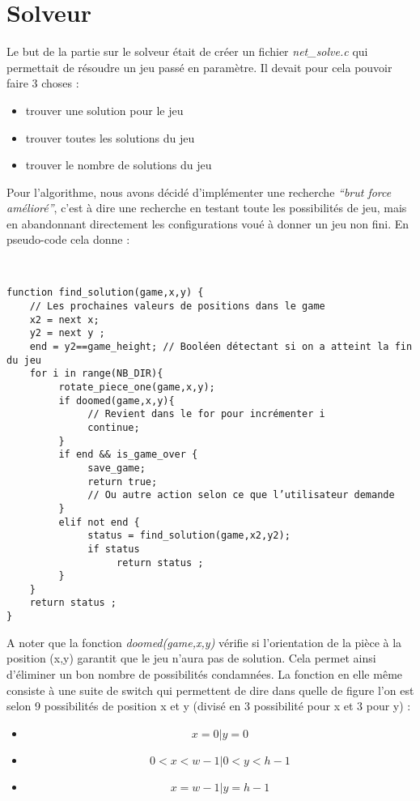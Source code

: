 ﻿\documentclass[12pt]{article}
\begin{document}
\section{Solveur}


Le but de la partie sur le solveur était de créer un fichier \emph{net\_solve.c} qui permettait de résoudre un jeu passé en paramètre. Il devait pour cela pouvoir faire 3 choses :
\begin{itemize}
\item trouver une solution pour le jeu
\item trouver toutes les solutions du jeu
\item trouver le nombre de solutions du jeu
\end{itemize}


Pour l’algorithme, nous avons décidé d'implémenter une recherche \emph{“brut force amélioré”}, c’est à dire une recherche en testant toute les possibilités de jeu, mais en abandonnant directement les configurations voué à donner un jeu non fini. En pseudo-code cela donne :


\begin{verbatim}


function find_solution(game,x,y) {
    // Les prochaines valeurs de positions dans le game
    x2 = next x;
    y2 = next y ;
    end = y2==game_height; // Booléen détectant si on a atteint la fin du jeu
    for i in range(NB_DIR){
         rotate_piece_one(game,x,y);
         if doomed(game,x,y){          
              // Revient dans le for pour incrémenter i
              continue;
         }
         if end && is_game_over {      
              save_game;
              return true;
              // Ou autre action selon ce que l’utilisateur demande
         }
         elif not end {
              status = find_solution(game,x2,y2);
              if status
                   return status ;
         }
    }
    return status ;
}
\end{verbatim}


A noter que la fonction \emph{doomed(game,x,y)} vérifie si l’orientation de la pièce à la position (x,y) garantit que le jeu n’aura pas de solution. Cela permet ainsi d’éliminer un bon nombre de possibilités condamnées. La fonction en elle même consiste à une suite de switch qui permettent de dire dans quelle de figure l’on est selon 9 possibilités de position x et y (divisé en 3 possibilité pour x et 3 pour y) :


\begin{itemize}
\item
\begin{equation} x = 0 | y = 0
\end{equation}
\item
\begin{equation}0 < x < w -1 | 0 < y < h -1 
\end{equation}
\item
\begin{equation} x = w -1 | y = h -1
\end{equation}
\end{itemize}
\end{document}
